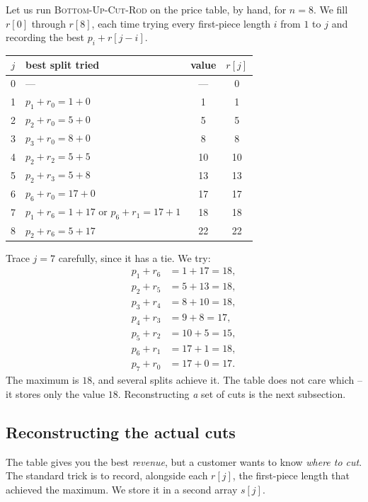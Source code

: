\begin{labbox}
Let us run \textsc{Bottom-Up-Cut-Rod} on the price table, by hand, for $n=8$.
We fill $r[0]$ through $r[8]$, each time trying every first-piece length $i$
from $1$ to $j$ and recording the best $p_i + r[j-i]$.

\begin{center}
\begin{tabular}{c l c c}
\toprule
$j$ & best split tried & value & $r[j]$ \\
\midrule
0 & --- & --- & 0 \\
1 & $p_1+r_0=1+0$ & 1 & 1 \\
2 & $p_2+r_0=5+0$ & 5 & 5 \\
3 & $p_3+r_0=8+0$ & 8 & 8 \\
4 & $p_2+r_2=5+5$ & 10 & 10 \\
5 & $p_2+r_3=5+8$ & 13 & 13 \\
6 & $p_6+r_0=17+0$ & 17 & 17 \\
7 & $p_1+r_6=1+17$ \;or\; $p_6+r_1=17+1$ & 18 & 18 \\
8 & $p_2+r_6=5+17$ & 22 & 22 \\
\bottomrule
\end{tabular}
\end{center}

Trace $j=7$ carefully, since it has a tie. We try:
\begin{align*}
  p_1+r_6 &= 1 + 17 = 18,\\
  p_2+r_5 &= 5 + 13 = 18,\\
  p_3+r_4 &= 8 + 10 = 18,\\
  p_4+r_3 &= 9 + 8 = 17,\\
  p_5+r_2 &= 10 + 5 = 15,\\
  p_6+r_1 &= 17 + 1 = 18,\\
  p_7+r_0 &= 17 + 0 = 17.
\end{align*} The maximum is $18$, and
several splits achieve it. The table does not care which -- it stores only the
value $18$. Reconstructing \emph{a} set of cuts is the next subsection.
\end{labbox}

\subsection{Reconstructing the actual cuts}

The table gives you the best \emph{revenue}, but a customer wants to know
\emph{where to cut}. The standard trick is to record, alongside each $r[j]$, the
first-piece length that achieved the maximum. We store it in a second array
$s[j]$.

